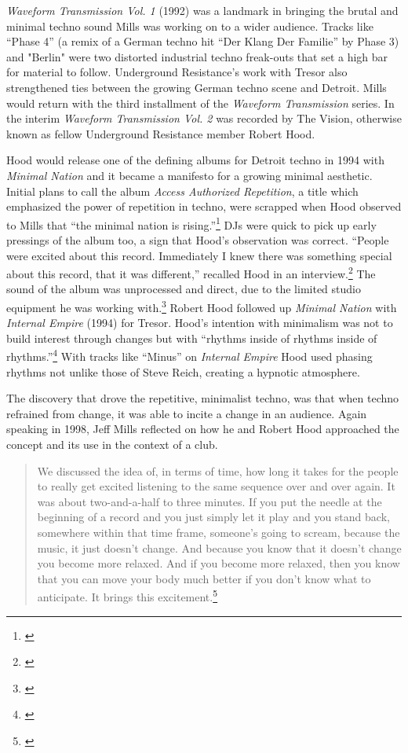 \documentclass[12pt,twoside]{reedthesis}
\begin{document}
\emph{Waveform Transmission Vol. 1} (1992) was a landmark in bringing the brutal and minimal techno sound Mills was working on to a wider audience. Tracks like ``Phase 4'' (a remix of a German techno hit ``Der Klang Der Familie'' by Phase 3) and "Berlin" were two distorted industrial techno freak-outs that set a high bar for material to follow. Underground Resistance's work with Tresor also strengthened ties between the growing German techno scene and Detroit. Mills would return with the third installment of the \emph{Waveform Transmission} series. In the interim \emph{Waveform Transmission Vol. 2} was recorded by The Vision, otherwise known as fellow Underground Resistance member Robert Hood.

Hood would release one of the defining albums for Detroit techno in 1994 with \emph{Minimal Nation} and it became a manifesto for a growing minimal aesthetic. Initial plans to call the album \emph{Access Authorized Repetition}, a title which emphasized the power of repetition in techno, were scrapped when Hood observed to Mills that ``the minimal nation is rising.''\footnote{\cite{holbenMakingMinimalNation2019}} DJs were quick to pick up early pressings of the album too, a sign that Hood's observation was correct. ``People were excited about this record. Immediately I knew there was something special about this record, that it was different,'' recalled Hood in an interview.\footnote{\cite{holbenMakingMinimalNation2019}} The sound of the album was unprocessed and direct, due to the limited studio equipment he was working with.\footnote{\cite{holbenMakingMinimalNation2019}} Robert Hood followed up \emph{Minimal Nation} with \emph{Internal Empire} (1994) for Tresor. Hood's intention with minimalism was not to build interest through changes but with ``rhythms inside of rhythms inside of rhythms.''\footnote{\cite{burnsRobertHoodLecture2014}} With tracks like ``Minus'' on \emph{Internal Empire} Hood used phasing rhythms not unlike those of Steve Reich, creating a hypnotic atmosphere.

The discovery that drove the repetitive, minimalist techno, was that when techno refrained from change, it was able to incite a change in an audience. Again speaking in 1998, Jeff Mills reflected on how he and Robert Hood approached the concept and its use in the context of a club.

\begin{quote}
	We discussed the idea of, in terms of time, how long it takes for the people to really get excited listening to the same sequence over and over again. It was about two-and-a-half to three minutes. If you put the needle at the beginning of a record and you just simply let it play and you stand back, somewhere within that time frame, someone’s going to scream, because the music, it just doesn’t change. And because you know that it doesn’t change you become more relaxed. And if you become more relaxed, then you know that you can move your body much better if you don’t know what to anticipate. It brings this excitement.\footnote{\cite{schmidtJeffMillsLecture1998a}}
\end{quote}
\end{document}
